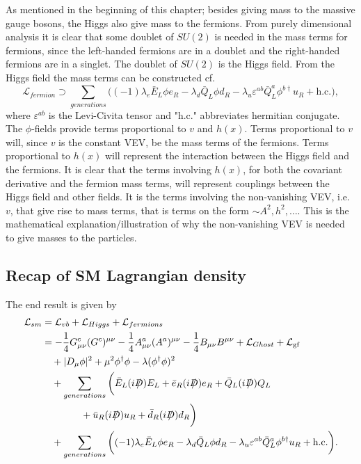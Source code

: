 As mentioned in the beginning of this chapter; besides giving mass to the massive gauge bosons, the Higgs also give mass to the fermions. From purely dimensional analysis it is clear that some doublet of $SU(2)$ is needed in the mass terms for fermions, since the left-handed fermions are in a doublet and the right-handed fermions are in a singlet. The doublet of $SU(2)$ is the Higgs field. From the Higgs field the mass terms can be constructed cf.
\begin{equation}
	\mathcal{L}_{fermion}\supset \sum_{generations}\bigg((-1)\lambda_e\bar{E}_L\phi e_R-\lambda_d\bar{Q}_L\phi d_R-\lambda_u\varepsilon^{ab}\bar{Q}_L^a\phi^{b\dagger}u_R+\text{h.c.}\bigg),
\end{equation} 
where $\varepsilon^{ab}$ is the Levi-Civita tensor and "h.c." abbreviates hermitian conjugate. The $\phi$-fields provide terms proportional to $v$ and $h(x)$. Terms proportional to $v$ will, since $v$ is the constant VEV, be the mass terms of the fermions. Terms proportional to $h(x)$ will represent the interaction between the Higgs field and the fermions. It is clear that the terms involving $h(x)$, for both the covariant derivative and the fermion mass terms, will represent couplings between the Higgs field and other fields. It is the terms involving the non-vanishing VEV, i.e. $v$, that give rise to mass terms, that is terms on the form $\sim A^2,h^2,\dots$. This is the mathematical explanation/illustration of why the non-vanishing VEV is needed to give masses to the particles.

\subsection*{Recap of SM Lagrangian density}
The end result is given by
\begin{equation}
	\begin{split}
		\mathcal{L}_{sm}&=\mathcal{L}_{vb}+\mathcal{L}_{Higgs}+\mathcal{L}_{fermions}\\
		&=-\frac{1}{4}G^c_{\mu\nu}(G^c)^{\mu\nu}-\frac{1}{4}A^a_{\mu\nu}(A^a)^{\mu\nu}-\frac{1}{4}B_{\mu\nu}B^{\mu\nu}+\mathcal{L}_{Ghost}+\mathcal{L}_{\text{gf}}\\
		&\quad+|D_\mu\phi|^2+\mu^2\phi^\dagger\phi-\lambda(\phi^\dagger\phi)^2\\
		&\quad+\sum_{generations}\bigg(\bar{E}_L(i\slashed D)E_L+\bar{e}_R(i\slashed D)e_R+\bar{Q}_L(i \slashed D)Q_L\\
		&\qquad\qquad+\bar{u}_R(i \slashed D)u_R+\bar{d}_R(i \slashed D)d_R\bigg)\\
		&\quad+\sum_{generations}\bigg((-1)\lambda_e\bar{E}_L\phi e_R-\lambda_d\bar{Q}_L\phi d_R-\lambda_u\varepsilon^{ab}\bar{Q}_L^a\phi^{b\dagger}u_R+\text{h.c.}\bigg).\\
	\end{split}
\end{equation} 



